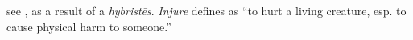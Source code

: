 \item[Injure,]

see , as a result of a \emph{hybristēs}. \emph{Injure} defines as ``to hurt a living creature, esp. to cause physical harm to someone.''
